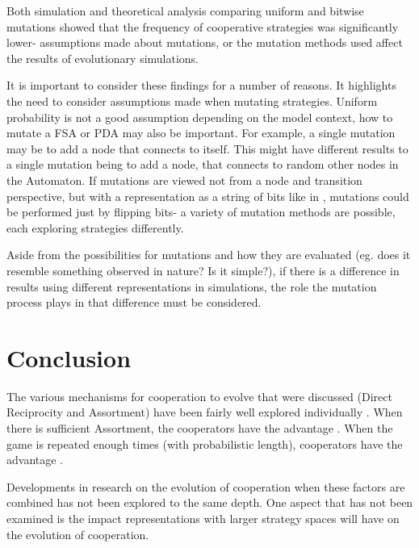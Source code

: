 \documentclass[a4paper,11pt]{article}
\begin{document}
Both simulation and theoretical analysis comparing uniform and bitwise mutations showed that the frequency of cooperative strategies was significantly lower- assumptions made about mutations, or the mutation methods used affect the results of evolutionary simulations. 

It is important to consider these findings for a number of reasons. 
It highlights the need to consider assumptions made when mutating strategies. 
Uniform probability is not a good assumption depending on the model context, how to mutate a FSA or PDA may also be important. For example, a single mutation may be to add a node that connects to itself. 
This might have different results to a single mutation being to add a node, that connects to random other nodes in the Automaton. If mutations are viewed not from a node and transition perspective, but with a representation as a string of bits like in \cite{miller1996coevolution}, mutations could be performed just by flipping bits- a variety of mutation methods are possible, each exploring strategies differently.

Aside from the possibilities for mutations and how they are evaluated (eg. does it resemble something observed in nature? Is it simple?), if there is a difference in results using different representations in simulations, the role the mutation process plays in that difference must be considered. 

\section{Conclusion}
\label{sec:conc}
The various mechanisms for cooperation to evolve that were discussed (Direct Reciprocity and Assortment) have been fairly well explored individually \citep{imhof:PNAS:2005, nowak:Science:2006}. 
When there is sufficient Assortment, the cooperators have the advantage \citep{bergstrom2003algebra}. 
When the game is repeated enough times (with probabilistic length), cooperators have the advantage \citep{Axelrod1984}. 

Developments in research on the evolution of cooperation when these factors are combined has not been explored to the same depth. One aspect that has not been examined is the impact representations with larger strategy spaces will have on the evolution of cooperation.
\end{document}

